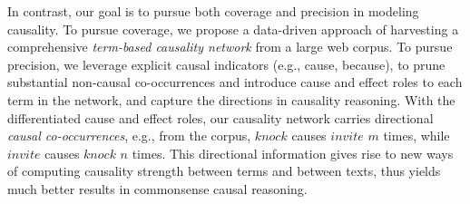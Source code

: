 In contrast, our goal is to pursue both coverage and precision
in modeling causality.
To pursue coverage, we propose a data-driven approach of harvesting
a comprehensive \emph{term-based causality network} from a large web corpus.
To pursue precision, we leverage explicit causal indicators
(e.g., cause, because), to prune substantial non-causal co-occurrences and
introduce cause and effect roles to each term in the network, and
capture the directions in causality reasoning.
With the differentiated cause and effect roles, our causality network carries
directional {\em causal co-occurrences}, e.g., from the corpus,
$knock$ causes $invite$ $m$ times, while $invite$ causes
$knock$ $n$ times. This directional information gives rise to new ways of
computing causality strength between terms and between texts, thus yields much
better results in commonsense causal reasoning.


